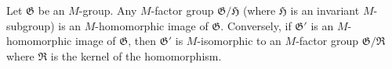 Let $\mathfrak{G}$ be an $M$-group. Any $M$-factor group $\mathfrak{G}/\mathfrak{H}$ (where $\mathfrak{H}$ is an invariant $M$-subgroup) is an $M$-homomorphic image of $\mathfrak{G}$. Conversely, if $\mathfrak{G}'$ is an $M$-homomorphic image of $\mathfrak{G}$, then $\mathfrak{G}'$ is $M$-isomorphic to an $M$-factor group $\mathfrak{G}/\mathfrak{R}$ where $\mathfrak{R}$ is the kernel of the homomorphism.
